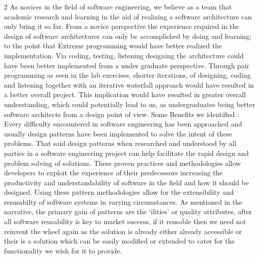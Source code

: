 \begin{multicols}{2}
			As novices in the field of software engineering, we believe as a team that academic research and learning in the aid of realizing 
			a software architecture can only bring it so far.  From a novice perspective the experience required in the design of software 
			architectures can only be accomplished by doing and learning; to the point that Extreme programming would have better 
			realized the implementation.
			\newline
			\newline
			Via coding, testing, listening designing the architecture could have been better implemented from a under graduate perspective.  
			Through pair programming as seen in the lab exercises, shorter iterations, of designing, coding and listening together with an 
			iterative waterfall approach would have resulted in a better overall project.  This implication would have resulted in greater 
			overall understanding, which could potentially lead to us, as undergraduates being better software architects from a design 
			point of view.
			\newline
			\newline
			Some Benefits we identified :
			\newline
			\newline
			Every difficulty encountered in software engineering has been approached and usually design patterns have been implemented to solve 
			the intent of these problems.  That said design patterns when researched and understood by all parties in a software engineering 
			project can help facilitate the rapid design and problem solving of solutions.  
			\newline
			\newline
			These proven practices and methodologies allow developers to exploit the experience of their predecessors increasing the 
			productivity and understandability of  software in the field and how it should be designed.  Using these pattern methodologies 
			allow for the extensibility and resusabilty of software systems in varying circumstances.
			\newline
			\newline
			As mentioned in the narrative, the primary gain of patterns are the ‘ilities’ or quality attributes, after all software 
			reusability is key to market success, if it reusable then we need not reinvent the wheel again as the solution is already 
			either already accessible or their is a solution which can be easily modified or extended to cater for the functionality 
			we wish for it to provide.

\end{multicols}
